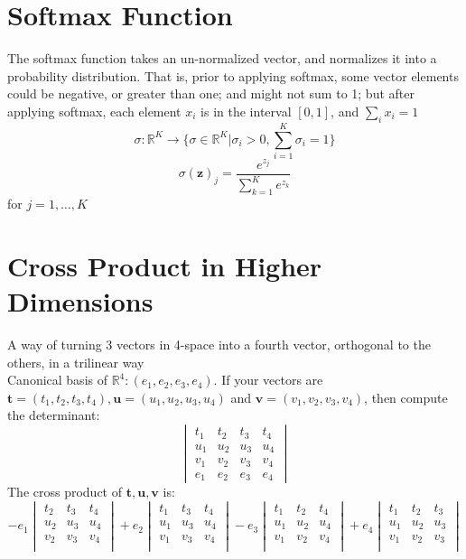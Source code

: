 \documentclass[11pt]{article}
\newcommand{\tb}[1]{\textbf{#1}}
\newcommand{\real}[0]{\mathbb{R}}
\newcommand{\vz}[0]{\tb{z}}
\begin{document}
	\section{Softmax Function}
	The softmax function takes an un-normalized vector, and normalizes it into a probability distribution. That is, prior to applying softmax, some vector elements could be negative, or greater than one; and might not sum to 1; but after applying softmax, each element $x_i$ is in the interval $[0,1]$, and $\sum_i x_i = 1$ \\
	$$\sigma:\real^K \rightarrow \{\sigma\in \real^K|\sigma_i>0,\sum_{i=1}^K \sigma_i = 1\}$$
	$$\sigma(\vz)_j = \frac{e^{z_j}}{\sum_{k=1}^K e^{z_k}}$$ for $j = 1,\hdots,K$
	\section{Cross Product in Higher Dimensions}
	A way of turning 3 vectors in 4-space into a fourth vector, orthogonal to the others, in a trilinear way \\
	Canonical basis of $\real^4: (e_1, e_2, e_3, e_4)$. If your vectors are $\tb{t} = (t_1, t_2, t_3, t_4), \tb{u} = (u_1, u_2, u_3, u_4)$ and $\tb{v} = (v_1, v_2, v_3, v_4)$, then compute the determinant:
	$$\begin{vmatrix}
	t_1 & t_2 & t_3 & t_4 \\
	u_1 & u_2 & u_3 & u_4 \\
	v_1 & v_2 & v_3 & v_4 \\
	e_1 & e_2 & e_3 & e_4
	\end{vmatrix}$$
	The cross product of $\tb{t}, \tb{u}, \tb{v}$ is:
		$$-e_1\begin{vmatrix}
	 t_2 & t_3 & t_4 \\
	 u_2 & u_3 & u_4 \\
	 v_2 & v_3 & v_4 \\
	\end{vmatrix}
	+e_2\begin{vmatrix}
	t_1 & t_3 & t_4 \\
	u_1 & u_3 & u_4 \\
	v_1 & v_3 & v_4 \\
	\end{vmatrix}
	- e_3\begin{vmatrix}
	t_1 & t_2 & t_4 \\
	u_1 & u_2 & u_4 \\
	v_1 & v_2 & v_4 \\
	\end{vmatrix}
	+ e_4\begin{vmatrix}
	t_1 & t_2 & t_3 \\
	u_1 & u_2 & u_3 \\
	v_1 & v_2 & v_3 \\
	\end{vmatrix}
	$$
\end{document}
